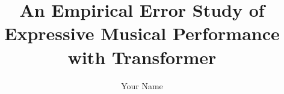 \documentclass[doublespace,nopageskip]{VTthesis} %
\title{An Empirical Error Study of Expressive Musical Performance with Transformer}
\author{Your Name}
\begin{document}
  \frontmatter
  \maketitle
  \tableofcontents

	\listoffigures
	\listoftables

	\mainmatter

	\listoftodos
	
	
	
	
	
	
	
	

	


	
      
    
\end{document}
